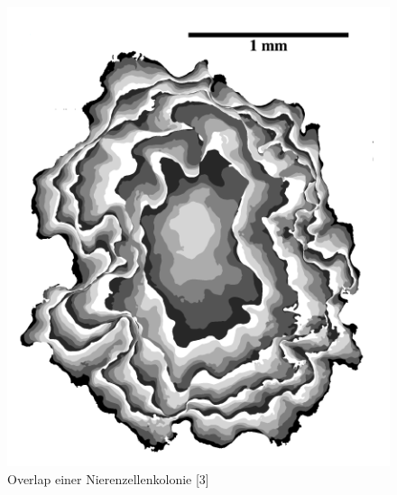 \documentclass[11pt,a4paper,pointlessnumbers]{scrreprt}  %
\begin{document}
\begin{figure}[!ht]
	\centering
	\includegraphics{ZellflaecheJeK}
	\caption{Overlap einer Nierenzellenkolonie [3]}
	\label{fig:Zellflaeche}
\end{figure}
\end{document}
